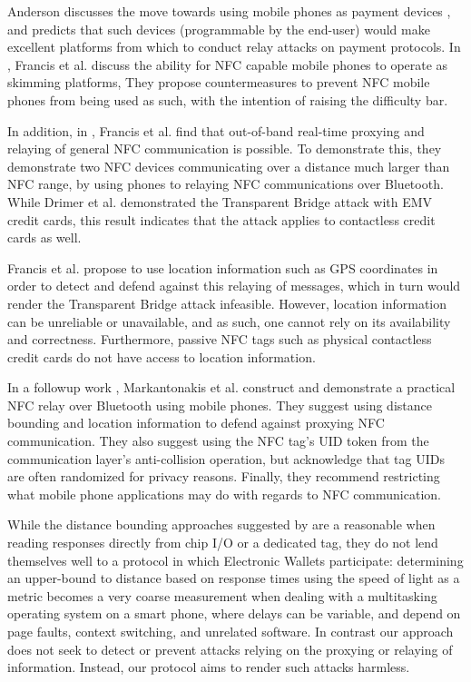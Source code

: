Anderson discusses the move towards using mobile phones as payment devices \cite{anderson2007position},
    and predicts that such devices (programmable by the end-user) would make excellent platforms from which to conduct relay attacks on payment protocols.
In \cite{francis2010security}, Francis et al. discuss the ability for NFC capable mobile phones to operate as skimming platforms,
They propose countermeasures to prevent NFC mobile phones from being used as such, with the intention of raising the difficulty bar.

In addition, in \cite{francis2010practical}, Francis et al. find that out-of-band real-time proxying and relaying of general NFC communication is possible.
To demonstrate this, they demonstrate two NFC devices communicating over a distance much larger than NFC range,
    by using phones to relaying NFC communications over Bluetooth.
While Drimer et al. demonstrated the Transparent Bridge attack with EMV credit cards,
    this result indicates that the attack applies to contactless credit cards as well.

Francis et al. propose to use location information such as GPS coordinates in order to detect and defend against this relaying of messages,
    which in turn would render the Transparent Bridge attack infeasible.
However, location information can be unreliable or unavailable, and as such, one cannot rely on its availability and correctness.
Furthermore, passive NFC tags such as physical contactless credit cards do not have access to location information.

In a followup work \cite{markantonakis2012practical}, Markantonakis et al. construct and demonstrate a practical NFC relay over Bluetooth using mobile phones.
They suggest using distance bounding and location information to defend against proxying NFC communication.
They also suggest using the NFC tag's UID token from the communication layer's anti-collision operation,
    but acknowledge that tag UIDs are often randomized for privacy reasons.
Finally, they recommend restricting what mobile phone applications may do with regards to NFC communication.

While the distance bounding approaches suggested by \cite{francis2010practical, markantonakis2012practical, Drimer:2007:KYE:1362903.1362910}
    are a reasonable when reading responses directly from chip I/O or a dedicated tag,
    they do not lend themselves well to a protocol in which Electronic Wallets participate:
determining an upper-bound to distance based on response times using the speed of light as a metric becomes a very coarse measurement
    when dealing with a multitasking operating system on a smart phone, where delays can be variable, and depend on page faults, context switching, and unrelated software.
In contrast our approach does not seek to detect or prevent attacks relying on the proxying or relaying of information.
Instead, our protocol aims to render such attacks harmless.


